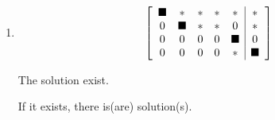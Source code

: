 \documentclass{ximera}
\begin{document}
\begin{exercise}
\begin{enumerate}
\item \begin{equation*}
    \startmat{ccccc|c}
      \blacksquare & \ast & \ast & \ast & \ast & \ast \\
      0 & \blacksquare & \ast & \ast & 0 & \ast \\
      0 & 0 & 0 & 0 & \blacksquare & 0 \\
      0 & 0 & 0 & 0 & \ast & \blacksquare
    \stopmat
\end{equation*}

The solution  exist.

    \begin{problem}
    
        If it exists, there is(are)  solution(s).

    \end{problem}


\end{enumerate}

\end{exercise}
\end{document}
